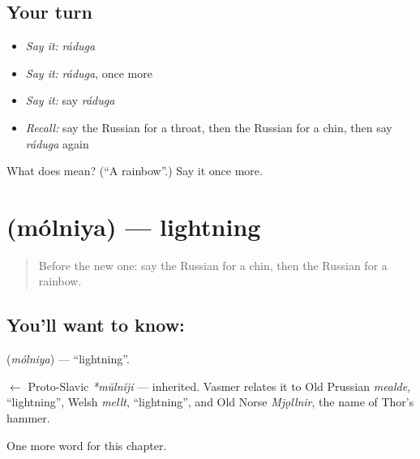 \subsection*{Your turn}
\begin{itemize}
\raggedright
  \item \emph{Say it:} \emph{ráduga}
  \item \emph{Say it:} \emph{ráduga}, once more
  \item \emph{Say it:} say \emph{ráduga}
  \item \emph{Recall:} say the Russian for a throat, then the Russian for a chin, then say \emph{ráduga} again
\end{itemize}

\begin{tcolorbox}[breakable,colback=teal!4,colframe=teal!35!black,title={Before you move on}]
What does  mean? (\textquotedblleft{}A rainbow\textquotedblright{}.) Say it once more.
\end{tcolorbox}
\section[\texorpdfstring{\ru{молния} (mólniya)}{молния (mólniya)}]{ (mólniya) — lightning}

\label{lesson:RU-C122-lightning}



\begin{quote}
Before the new one: say the Russian for a chin, then the Russian for a rainbow.
\end{quote}

\subsection*{You'll want to know: }
\textbf{} (\emph{mólniya}) — \textquotedblleft{}lightning\textquotedblright{}.

\begin{cousinweb}
\textbf{} $\leftarrow$ Proto-Slavic \emph{*mŭlnĭji} — inherited. Vasmer relates it to Old Prussian \emph{mealde}, \textquotedblleft{}lightning\textquotedblright{}, Welsh \emph{mellt}, \textquotedblleft{}lightning\textquotedblright{}, and Old Norse \emph{Mjǫllnir}, the name of Thor's hammer.
\end{cousinweb}

\begin{grammarlens}[title={What you've built}]
One more word for this chapter.
\end{grammarlens}

